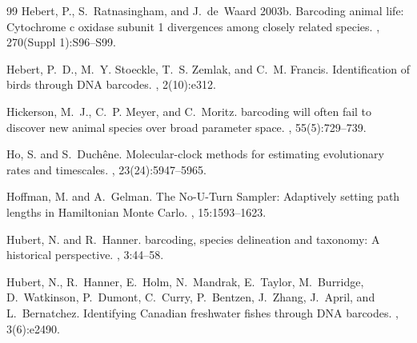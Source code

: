 \documentclass[12pt]{article}
\begin{document}
\begin{thebibliography}{99}
Hebert, P., S.~Ratnasingham, and J.~de~Waard\leavevmode\nopagebreak\newline
  2003b.
\newblock Barcoding animal life: {C}ytochrome c oxidase subunit 1 divergences
  among closely related species.
, 270(Suppl 1):S96--S99.

Hebert, P.~D., M.~Y. Stoeckle, T.~S. Zemlak, and C.~M.
  Francis\leavevmode\nopagebreak{}.
\newblock Identification of birds through {DNA} barcodes.
, 2(10):e312.

Hickerson, M.~J., C.~P. Meyer, and C.~Moritz\leavevmode\nopagebreak{}.
 barcoding will often fail to discover new animal species over
  broad parameter space.
, 55(5):729--739.

Ho, S. and S.~Duch\^{e}ne\leavevmode\nopagebreak{}.
\newblock Molecular-clock methods for estimating evolutionary rates and
  timescales.
, 23(24):5947--5965.

Hoffman, M. and A.~Gelman\leavevmode\nopagebreak{}.
\newblock The {N}o-{U}-{T}urn {S}ampler: {A}daptively setting path lengths in
  {H}amiltonian {M}onte {C}arlo.
, 15:1593--1623.

Hubert, N. and R.~Hanner\leavevmode\nopagebreak{}.
 barcoding, species delineation and taxonomy: {A} historical
  perspective.
, 3:44--58.

Hubert, N., R.~Hanner, E.~Holm, N.~Mandrak, E.~Taylor, M.~Burridge,
  D.~Watkinson, P.~Dumont, C.~Curry, P.~Bentzen, J.~Zhang, J.~April, and
  L.~Bernatchez\leavevmode\nopagebreak{}.
\newblock Identifying {C}anadian freshwater fishes through {DNA} barcodes.
, 3(6):e2490.


\end{thebibliography}
\end{document}
